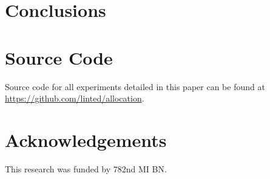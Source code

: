 \documentclass[letterpaper, 10 pt, conference]{ieeeconf}  %
\newcommand*\GitHubLoc{https://github.com/linted/allocation}
\begin{document}


\section{Conclusions}


\section{Source Code}

Source code for all experiments detailed in this paper can be found at \url{\GitHubLoc}.






\section{Acknowledgements}

\noindent This research was funded by 782nd MI BN.

\clearpage
\end{document}
